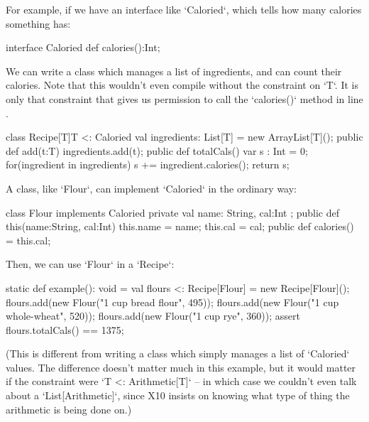 For example, if we have an interface like \xcd`Caloried`, which tells how many
calories something has: 
\begin{xtennum}[]
interface Caloried {
  def calories():Int;
}
\end{xtennum}

We can write a class which manages a list of ingredients, and can count their
calories.  Note that this wouldn't even compile without the constraint 
on \xcd`T`.  It is only that constraint that gives us permission to 
call the \xcd`calories()` method in line
.  
\begin{xtennum}[]
class Recipe[T]{T <: Caloried} {
   val ingredients: List[T] = new ArrayList[T]();
   public def add(t:T) { ingredients.add(t); }
   public def totalCals() {
      var s : Int = 0;
      for(ingredient in ingredients) 
          s += ingredient.calories(); 
      return s;
   }
}
\end{xtennum}

A class, like \xcd`Flour`, can implement \xcd`Caloried` in the ordinary way: 
\begin{xtennum}[]
class Flour implements Caloried {
  private val name: String, cal:Int ;
  public def this(name:String, cal:Int) 
    { this.name = name; this.cal = cal; }
  public def calories() = this.cal;
}
\end{xtennum}

Then, we can use \xcd`Flour` in a \xcd`Recipe`: 

\begin{xtennum}[]
static def example(): void = {
  val flours <: Recipe[Flour] = new Recipe[Flour]();
  flours.add(new Flour("1 cup bread flour", 495));
  flours.add(new Flour("1 cup whole-wheat", 520));
  flours.add(new Flour("1 cup rye", 360));
  assert flours.totalCals() == 1375;
}
\end{xtennum}



(This is different from writing a class which simply manages a list of
\xcd`Caloried` values.  The difference doesn't matter much in this example,
but it would matter if the constraint were \xcd`T <: Arithmetic[T]` -- in
which case we couldn't even talk about a \xcd`List[Arithmetic]`, since X10
insists on knowing what type of thing the arithmetic is being done on.)


